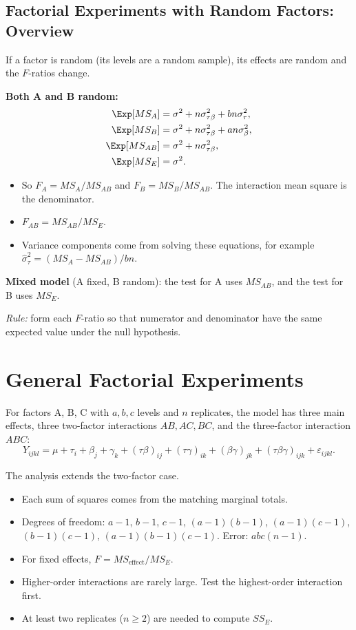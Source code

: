 \subsection{Factorial Experiments with Random Factors: Overview}

If a factor is random (its levels are a random sample), its effects are random and the $F$-ratios change.

\textbf{Both A and B random:}
\begin{align*}
\Exp[MS_A]&=\sigma^2+n\sigma_{\tau\beta}^2+bn\sigma_\tau^2,\\
\Exp[MS_B]&=\sigma^2+n\sigma_{\tau\beta}^2+an\sigma_\beta^2,\\
\Exp[MS_{AB}]&=\sigma^2+n\sigma_{\tau\beta}^2,\\
\Exp[MS_E]&=\sigma^2.
\end{align*}
\begin{itemize}
  \item So $F_A=MS_A/MS_{AB}$ and $F_B=MS_B/MS_{AB}$. The interaction mean square is the denominator.
  \item $F_{AB}=MS_{AB}/MS_E$.
  \item Variance components come from solving these equations, for example $\hat\sigma_\tau^2=(MS_A-MS_{AB})/bn$.
\end{itemize}
\textbf{Mixed model} (A fixed, B random): the test for A uses $MS_{AB}$, and the test for B uses $MS_E$.

\emph{Rule:} form each $F$-ratio so that numerator and denominator have the same expected value under the null hypothesis.

\section{General Factorial Experiments}

\begin{definition}
For factors A, B, C with $a,b,c$ levels and $n$ replicates, the model has three main effects, three two-factor interactions $AB,AC,BC$, and the three-factor interaction $ABC$:
\[ Y_{ijkl}=\mu+\tau_i+\beta_j+\gamma_k+(\tau\beta)_{ij}+(\tau\gamma)_{ik}+(\beta\gamma)_{jk}+(\tau\beta\gamma)_{ijk}+\varepsilon_{ijkl}. \]
\end{definition}

The analysis extends the two-factor case.
\begin{itemize}
  \item Each sum of squares comes from the matching marginal totals.
  \item Degrees of freedom: $a-1$, $b-1$, $c-1$, $(a-1)(b-1)$, $(a-1)(c-1)$, $(b-1)(c-1)$, $(a-1)(b-1)(c-1)$. Error: $abc(n-1)$.
  \item For fixed effects, $F=MS_{\text{effect}}/MS_E$.
  \item Higher-order interactions are rarely large. Test the highest-order interaction first.
  \item At least two replicates ($n\ge2$) are needed to compute $SS_E$.
\end{itemize}

